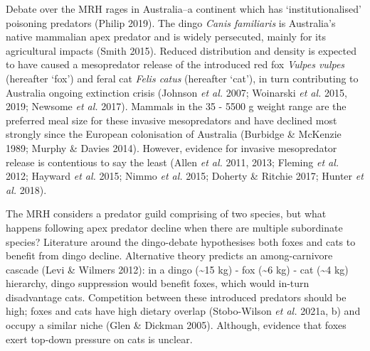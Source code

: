 \documentclass[11pt,a4paper,titlepage,twoside,openright]{style/unimelbthesis}
\begin{document}
\begin{mainmatter}
Debate over the MRH rages in Australia--a continent which has `institutionalised' poisoning predators (Philip 2019). The dingo \emph{Canis familiaris} is Australia's native mammalian apex predator and is widely persecuted, mainly for its agricultural impacts (Smith 2015). Reduced distribution and density is expected to have caused a mesopredator release of the introduced red fox \emph{Vulpes vulpes} (hereafter `fox') and feral cat \emph{Felis catus} (hereafter `cat'), in turn contributing to Australia ongoing extinction crisis (Johnson \emph{et al.} 2007; Woinarski \emph{et al.} 2015, 2019; Newsome \emph{et al.} 2017). Mammals in the 35 - 5500 g weight range are the preferred meal size for these invasive mesopredators and have declined most strongly since the European colonisation of Australia (Burbidge \& McKenzie 1989; Murphy \& Davies 2014). However, evidence for invasive mesopredator release is contentious to say the least (Allen \emph{et al.} 2011, 2013; Fleming \emph{et al.} 2012; Hayward \emph{et al.} 2015; Nimmo \emph{et al.} 2015; Doherty \& Ritchie 2017; Hunter \emph{et al.} 2018).

The MRH considers a predator guild comprising of two species, but what happens following apex predator decline when there are multiple subordinate species? Literature around the dingo-debate hypothesises both foxes and cats to benefit from dingo decline. Alternative theory predicts an among-carnivore cascade (Levi \& Wilmers 2012): in a dingo (\textasciitilde15 kg) - fox (\textasciitilde6 kg) - cat (\textasciitilde4 kg) hierarchy, dingo suppression would benefit foxes, which would in-turn disadvantage cats. Competition between these introduced predators should be high; foxes and cats have high dietary overlap (Stobo-Wilson \emph{et al.} 2021a, b) and occupy a similar niche (Glen \& Dickman 2005). Although, evidence that foxes exert top-down pressure on cats is unclear.


\end{mainmatter}
\end{document}
